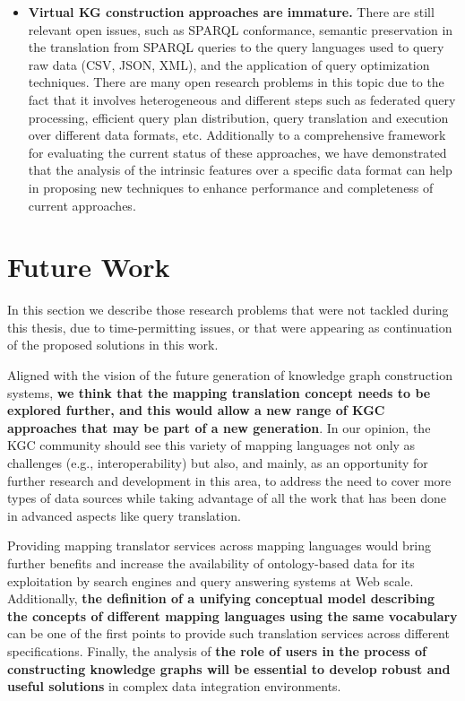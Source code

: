 \begin{itemize}
    \item \textbf{Virtual KG construction approaches are immature.} There are still relevant open issues, such as SPARQL conformance, semantic preservation in the translation from SPARQL queries to the query languages used to query raw data (CSV, JSON, XML), and the application of query optimization techniques. There are many open research problems in this topic due to the fact that it involves heterogeneous and different steps such as federated query processing, efficient query plan distribution, query translation and execution over different data formats, etc. Additionally to a comprehensive framework for evaluating the current status of these approaches, we have demonstrated that the analysis of the intrinsic features over a specific data format can help in proposing new techniques to enhance performance and completeness of current approaches. 
\end{itemize}


\section{Future Work}
In this section we describe those research problems that were not tackled during this thesis, due to time-permitting issues, or that were appearing as continuation of the proposed solutions in this work.

Aligned with the vision of the future generation of knowledge graph construction systems, \textbf{we think that the mapping translation concept needs to be explored further, and this would allow a new range of KGC approaches that may be part of a new generation}. In our opinion, the KGC community should see this variety of mapping languages not only as challenges (e.g., interoperability) but also, and mainly, as an opportunity for further research and development in this area, to address the need to cover more types of data sources while taking advantage of all the work that has been done in advanced aspects like query translation. 

Providing mapping translator services across mapping languages would bring further benefits and increase the availability of ontology-based data for its exploitation by search engines and query answering systems at Web scale. Additionally, \textbf{the definition of a unifying conceptual model describing the concepts of different mapping languages using the same vocabulary} can be one of the first points to provide such translation services across different specifications. Finally, the analysis of \textbf{the role of users in the process of constructing knowledge graphs will be essential to develop robust and useful solutions} in complex data integration environments.

